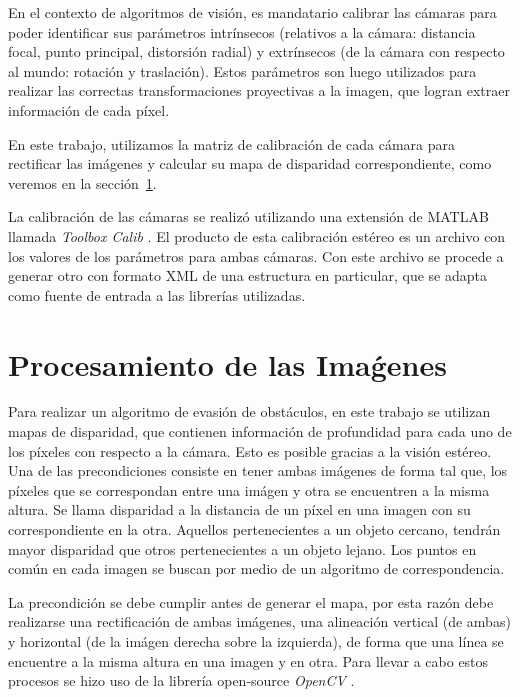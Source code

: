 \documentclass[journal]{IEEEtran}
\begin{document}
En el contexto de algoritmos de visi\'on, es mandatario calibrar las c\'amaras para poder identificar sus par\'ametros intr\'insecos (relativos a la c\'amara: distancia focal, punto principal, distorsi\'on radial) y extr\'insecos (de la c\'amara con respecto al mundo: rotaci\'on y traslaci\'on). Estos par\'ametros son luego utilizados para realizar las correctas transformaciones proyectivas a la imagen, que logran extraer informaci\'on de cada p\'ixel.

En este trabajo, utilizamos la matriz de calibraci\'on de cada c\'amara para rectificar las im\'agenes y calcular su mapa de disparidad correspondiente, como veremos en la secci\'on~\ref{sec:pro_img}.

La calibraci\'on de las c\'amaras se realiz\'o utilizando una extensi\'on de MATLAB llamada \emph{Toolbox Calib} \cite{B00}. El producto de esta calibraci\'on est\'ereo es un archivo con los valores de los par\'ametros para ambas c\'amaras. Con este archivo se procede a generar otro con formato XML de una estructura en particular, que se adapta como fuente de entrada a las librer\'ias utilizadas.

\section{Procesamiento de las Ima\'genes}
\label{sec:pro_img}

Para realizar un algoritmo de evasi\'on de obst\'aculos, en este trabajo se utilizan mapas de disparidad, que contienen informaci\'on de profundidad para cada uno de los p\'ixeles con respecto a la c\'amara. Esto es posible gracias a la visi\'on est\'ereo. Una de las precondiciones consiste en tener ambas im\'agenes de forma tal que, los p\'ixeles que se correspondan entre una im\'agen y otra se encuentren a la misma altura. Se llama disparidad a la distancia de un p\'ixel en una imagen con su correspondiente en la otra. Aquellos pertenecientes a un objeto cercano, tendr\'an mayor disparidad que otros pertenecientes a un objeto lejano. Los puntos en com\'un en cada imagen se buscan por medio de un algoritmo de correspondencia.

La precondici\'on se debe cumplir antes de generar el mapa, por esta raz\'on debe realizarse una rectificaci\'on de ambas im\'agenes, una alineaci\'on vertical (de ambas) y horizontal (de la im\'agen derecha sobre la izquierda), de forma que una l\'inea se encuentre a la misma altura en una imagen y en otra. Para llevar a cabo estos procesos se hizo uso de la librer\'ia open-source \emph{OpenCV} \cite{opencv}.
\end{document}
